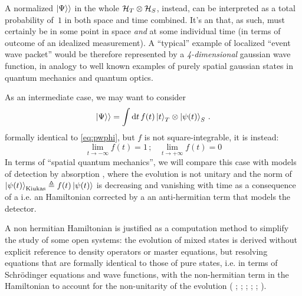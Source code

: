 A normalized $|\Psi\rangle\rangle$ in the whole $\mathcal{H}_T \otimes \mathcal{H}_S$,
instead,
can be interpreted as a total probability of~$1$ in both space and time combined.
It's an  that, as such, must certainly be in some point in space
\emph{and} at some individual time (in terms of outcome of an idealized measurement).
A ``typical'' example of localized ``event wave packet'' would be
therefore represented by
a \emph{4-dimensional} gaussian wave function,
in analogy to well known examples of purely spatial gaussian states
in quantum mechanics and quantum optics.

As an intermediate case, we may want to consider
\begin{equation}\label{eq:pwf}
  |\Psi\rangle\rangle =
    \int \dd{t} f(t) \ket{t}_T \otimes \ket{\psi(t)}_S \, \text{.}
\end{equation}
formally identical to \eqref{eq:pwphi},
but $f$ is not square-integrable, it is instead:
\begin{equation}
  \lim_{t\to -\infty} f(t) = 1 \, \text{;} \quad
  \lim_{t\to +\infty} f(t) = 0
\end{equation}
In terms of ``spatial quantum mechanics'', we will compare this case with
models of detection by absorption \parencite{RuschhauptAbsorption},
where the evolution is not unitary and
the norm of
$\ket{\psi(t)}_{\mathrm{Kiukas}} \triangleq f(t)\ket{\psi(t)}$
is decreasing and vanishing with time
as a consequence of a 
i.e.
an Hamiltonian corrected by a an anti-hermitian term
that models the detector.

A non hermitian Hamiltonian is justified as a computation method
to simplify the study of some open systems: the evolution of mixed
states is derived without explicit reference to density operators
or master equations, but resolving equations that are formally
identical to those of pure states,
i.e. in terms of
Schr{\"o}dinger equations and wave functions,
with the non-hermitian term in the Hamiltonian
to account for the non-unitarity of the evolution
(%
  \cite[Ch. 6]{TQM2};
  \cite{Wave-function_approach};
  \cite{HowToResetAnAtom};
  \cite{TheQuantumJumpApproach};
  \cite[\S 8.5 ``The `quantum jump' approach to damping'' and particularly \S 8.5.2 ``The wave function Monte Carlo approach to damping'']{ScullyZubairy};
  \cite[particularly \S 6.7.1 ``Simulating Quantum Trajectories'']{WallsMilburn}%
).

